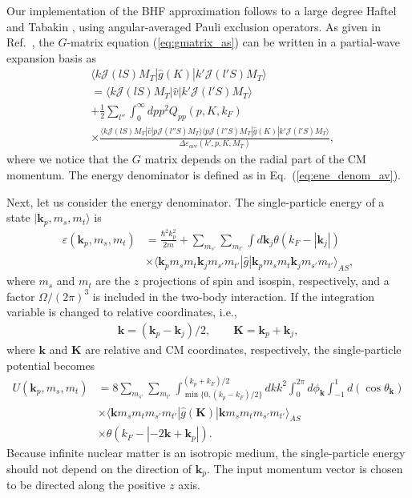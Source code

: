 \documentclass[a4paper,12pt]{report}
\begin{document}
Our implementation of the BHF approximation follows to a large degree Haftel and Tabakin \cite{haftel_tabakin}, using angular-averaged Pauli exclusion operators. As given in Ref.~\cite{haftel_tabakin}, the $G$-matrix equation (\ref{eq:gmatrix_as}) can be written in a partial-wave expansion basis as
\begin{align}
  & \langle k\mathcal{J}(lS)M_{T}|\hat{g}(K)|k'\mathcal{J}(l'S)M_{T}\rangle \nonumber \\
  &= \langle k\mathcal{J}(lS)M_{T}|\hat{v}|k'\mathcal{J}(l'S)M_{T}\rangle \nonumber \\
  & + \frac{1}{2}\sum_{l''}\int_{0}^{\infty }dp p^{2} Q_{pp}(p, K, k_{F}) \nonumber \\
  & \times \frac{\langle k\mathcal{J}(lS)M_{T}|\hat{v}|p\mathcal{J}(l''S)M_{T}\rangle \langle p\mathcal{J}(l''S)M_{T}|\hat{g}(K)|k'\mathcal{J}(l'S)M_{T}\rangle }{\Delta \varepsilon_{ave}(k', p, K, M_{T})},
  \label{eq:gmat_pw}
\end{align}
where we notice that the $G$ matrix depends on the radial part of the CM momentum. The energy denominator is defined as in Eq.~(\ref{eq:ene_denom_av}).

Next, let us consider the energy denominator. The single-particle energy of a state $|\mathbf{k}_{p}, m_{s}, m_{t}\rangle $ is 
\begin{align}
  \varepsilon(\mathbf{k}_{p}, m_{s}, m_{t}) &= \frac{\hbar^{2}k_{p}^{2}}{2m} + \sum_{m_{s'}}\sum_{m_{t'}}\int d\mathbf{k}_{j}\theta(k_{F}-|\mathbf{k}_{j}|) \nonumber \\
  & \times \langle \mathbf{k}_{p}m_{s}m_{t}\mathbf{k}_{j}m_{s'}m_{t'}|\hat{g}|\mathbf{k}_{p}m_{s}m_{t}\mathbf{k}_{j}m_{s'}m_{t'}\rangle_{AS},
\end{align}
where $m_{s}$ and $m_{t}$ are the $z$ projections of spin and isospin, respectively, and a factor $\Omega /(2\pi)^{3}$ is included in the two-body interaction. If the integration variable is changed to relative coordinates, i.e.,
\begin{align}
  \mathbf{k} = (\mathbf{k}_{p}-\mathbf{k}_{j})/2, \qquad \mathbf{K} = \mathbf{k}_{p} + \mathbf{k}_{j},
\end{align}
where $\mathbf{k}$ and $\mathbf{K}$ are relative and CM coordinates, respectively, the single-particle potential becomes 
\begin{align}
  U(\mathbf{k}_{p}, m_{s}, m_{t}) &= 8\sum_{m_{s'}}\sum_{m_{t'}}\int_{\min\{ 0, (k_{p}-k_{F})/2\}}^{(k_{p}+k_{F})/2}dk k^{2}\int_{0}^{2\pi }d\phi_{\mathbf{k}}\int_{-1}^{1}d(\cos\theta_{\mathbf{k}}) \nonumber \\
  & \times \langle \mathbf{k}m_{s}m_{t}m_{s'}m_{t'}|\hat{g}(\mathbf{K})|\mathbf{k}m_{s}m_{t}m_{s'}m_{t'}\rangle_{AS}  \nonumber \\
  & \times \theta(k_{F} - |-2\mathbf{k} + \mathbf{k}_{p}|). 
  \label{eq:u_bhf_2}
\end{align}
Because infinite nuclear matter is an isotropic medium, the single-particle energy should not depend on the direction of $\mathbf{k}_{p}$. The input momentum vector is chosen to be directed along the positive $z$ axis. 
 
\end{document}
